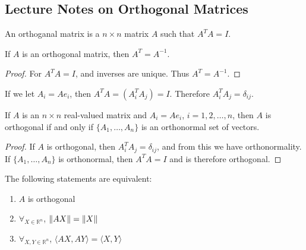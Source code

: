 \documentclass[../main.tex]{subfiles}
\begin{document}
\subsection{Lecture Notes on Orthogonal Matrices}
%
\begin{definition}
An orthoganal matrix is a $n\times n$ matrix $A$ such that $A^{T}A = I$.
\end{definition}
%
\begin{theorem}
If $A$ is an orthogonal matrix, then $A^T = A^{-1}$.
\end{theorem}
\begin{proof}
For $A^TA = I$, and inverses are unique. Thus $A^T = A^{-1}$.
\end{proof}
%
If we let $A_{i} = Ae_{i}$, then $A^TA = (A_{i}^{T}A_{j}) = I$. Therefore $A_i^TA_j = \delta_{ij}$.
%
\begin{theorem}
If $A$ is an $n\times n$ real-valued matrix and $A_i = Ae_i$, $i=1,2,\hdots, n$, then $A$ is orthogonal if and only if $\{A_1,\hdots, A_n\}$ is an orthonormal set of vectors.
\end{theorem}
\begin{proof}
If $A$ is orthogonal, then $A_{i}^{T}A_{j} = \delta_{ij}$, and from this we have orthonormality. If $\{A_1,\hdots, A_n\}$ is orthonormal, then $A^TA = I$ and is therefore orthogonal.
\end{proof}
%
\begin{theorem}
The following statements are equivalent:
\begin{enumerate}
    \item $A$ is orthogonal
    \item $\forall_{X\in\mathbb{R}^{n}}$, $\norm{AX} = \norm{X}$
    \item $\forall_{X,Y\in\mathbb{R}^{n}}$, $\langle AX, AY\rangle = \langle X, Y\rangle$
\end{enumerate}
\end{theorem}
\end{document}
